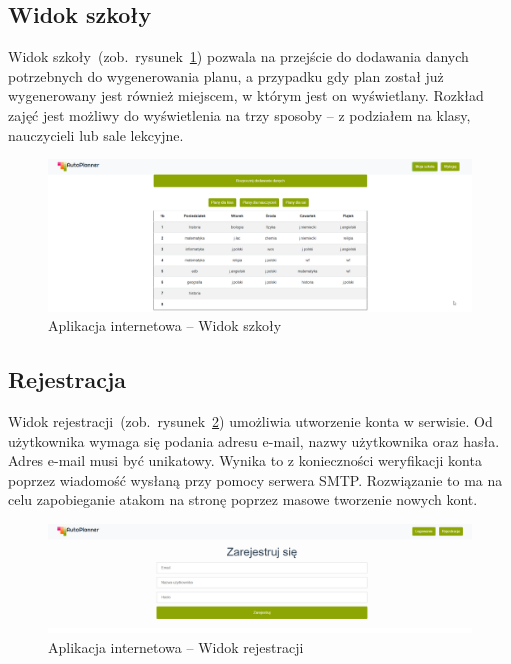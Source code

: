 \subsection{Widok szkoły}
Widok szkoły~(zob.~rysunek~\ref{rys:school}) pozwala na przejście do dodawania danych potrzebnych do wygenerowania planu, a przypadku gdy plan został już wygenerowany jest również miejscem, w którym jest on wyświetlany. Rozkład zajęć jest możliwy do wyświetlenia na trzy sposoby -- z podziałem na klasy, nauczycieli lub sale lekcyjne.

\begin{figure}[!ht]
\centering\includegraphics[width=\textwidth]{figures/school}
\caption{Aplikacja internetowa -- Widok szkoły}\label{rys:school}
\end{figure}
\subsection{Rejestracja}
Widok rejestracji~(zob.~rysunek~\ref{rys:register}) umożliwia utworzenie konta w serwisie. Od użytkownika wymaga się podania adresu e-mail, nazwy użytkownika oraz hasła. Adres e-mail musi być unikatowy. Wynika to z konieczności weryfikacji konta poprzez wiadomość wysłaną przy pomocy serwera SMTP. Rozwiązanie to ma na celu zapobieganie atakom na stronę poprzez masowe tworzenie nowych kont. 
\begin{figure}[!ht]
\centering\includegraphics[width=\textwidth]{figures/register}
\caption{Aplikacja internetowa -- Widok rejestracji}\label{rys:register}
\end{figure}
